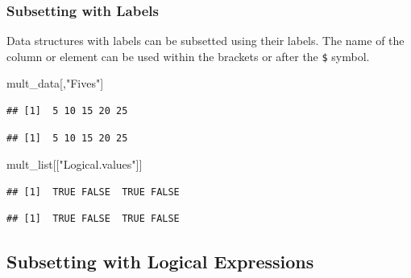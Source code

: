 \documentclass[
]{book}
\newenvironment{Shaded}{\begin{snugshade}}{\end{snugshade}}
\newcommand{\NormalTok}[1]{#1}
\newcommand{\SpecialCharTok}[1]{\textcolor[rgb]{0.81,0.36,0.00}{\textbf{#1}}}
\newcommand{\StringTok}[1]{\textcolor[rgb]{0.31,0.60,0.02}{#1}}
\theoremstyle{definition}
\theoremstyle{definition}
\theoremstyle{definition}
\theoremstyle{definition}
\theoremstyle{remark}
\begin{document}
\hypertarget{subsetting-with-labels-1}{%
\subsubsection{Subsetting with Labels}\label{subsetting-with-labels-1}}

Data structures with labels can be subsetted using their labels. The name of the column or element can be used within the brackets or after the \texttt{\$} symbol.

\begin{Shaded}
\begin{Highlighting}[]
\NormalTok{mult\_data[,}\StringTok{"Fives"}\NormalTok{]}
\end{Highlighting}
\end{Shaded}

\begin{verbatim}
## [1]  5 10 15 20 25
\end{verbatim}

\begin{Shaded}
\end{Shaded}

\begin{verbatim}
## [1]  5 10 15 20 25
\end{verbatim}

\begin{Shaded}
\begin{Highlighting}[]
\NormalTok{mult\_list[[}\StringTok{"Logical.values"}\NormalTok{]]}
\end{Highlighting}
\end{Shaded}

\begin{verbatim}
## [1]  TRUE FALSE  TRUE FALSE
\end{verbatim}

\begin{Shaded}
\end{Shaded}

\begin{verbatim}
## [1]  TRUE FALSE  TRUE FALSE
\end{verbatim}

\hypertarget{subsetting-with-logical-expressions}{%
\subsection{Subsetting with Logical Expressions}\label{subsetting-with-logical-expressions}}
\end{document}
